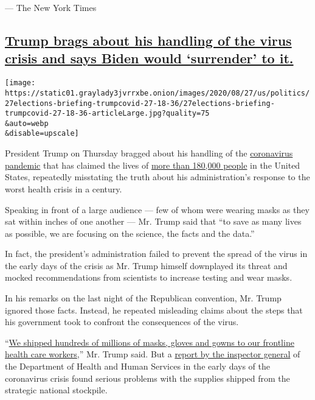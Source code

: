--- The New York Times

\hypertarget{trump-brags-about-his-handling-of-the-virus-crisis-and-says-biden-would-surrender-to-it}{%
\subsection{\texorpdfstring{\protect\hyperlink{trump-brags-about-his-handling-of-the-virus-crisis-and-says-biden-would-surrender-to-it}{Trump
brags about his handling of the virus crisis and says Biden would
`surrender' to
it.}}{Trump brags about his handling of the virus crisis and says Biden would `surrender' to it.}}\label{trump-brags-about-his-handling-of-the-virus-crisis-and-says-biden-would-surrender-to-it}}

\texttt{[image: https://static01.graylady3jvrrxbe.onion/images/2020/08/27/us/politics/27elections-briefing-trumpcovid-27-18-36/27elections-briefing-trumpcovid-27-18-36-articleLarge.jpg?quality=75\\\&auto=webp\\\&disable=upscale]}

President Trump on Thursday bragged about his handling of the
\href{https://www.nytimes3xbfgragh.onion/news-event/coronavirus}{coronavirus
pandemic} that has claimed the lives of
\href{https://www.nytimes3xbfgragh.onion/interactive/2020/us/coronavirus-us-cases.html}{more
than 180,000 people} in the United States, repeatedly misstating the
truth about his administration's response to the worst health crisis in
a century.

Speaking in front of a large audience --- few of whom were wearing masks
as they sat within inches of one another --- Mr. Trump said that ``to
save as many lives as possible, we are focusing on the science, the
facts and the data.''

In fact, the president's administration failed to prevent the spread of
the virus in the early days of the crisis as Mr. Trump himself
downplayed its threat and mocked recommendations from scientists to
increase testing and wear masks.

In his remarks on the last night of the Republican convention, Mr. Trump
ignored those facts. Instead, he repeated misleading claims about the
steps that his government took to confront the consequences of the
virus.

``\href{https://www.nytimes3xbfgragh.onion/live/2020/08/27/us/rnc-fact-check?action=click\&module=Spotlight\&pgtype=Homepage\#we-shipped-hundreds-of-millions-of-masks-gloves-and-gowns-to-our-front-line-health-care-workers}{We
shipped hundreds of millions of masks, gloves and gowns to our frontline
health care workers},'' Mr. Trump said. But a
\href{https://slack-redir.net/link?url=https\%3A\%2F\%2Foig.hhs.gov\%2Foei\%2Freports\%2Foei-06-20-00300.pdf}{report
by the inspector general} of the Department of Health and Human Services
in the early days of the coronavirus crisis found serious problems with
the supplies shipped from the strategic national stockpile.

